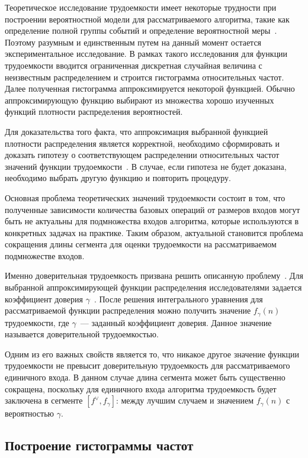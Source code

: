 \documentclass[a4paper, article, 14pt]{extarticle}
\begin{document}
Теоретическое исследование трудоемкости имеет некоторые трудности при построении вероятностной модели для рассматриваемого алгоритма, такие как определение полной группы событий и определение вероятностной меры~\cite{petrushyn_ulyanov_definitions}. Поэтому разумным и единственным путем на данный момент остается экспериментальное исследование. В рамках такого исследования для функции трудоемкости вводится ограниченная дискретная случайная величина с неизвестным распределением и строится гистограмма относительных частот. Далее полученная гистограмма аппроксимируется некоторой функцией. Обычно аппроксимирующую функцию выбирают из множества хорошо изученных функций плотности распределения вероятностей.

Для доказательства того факта, что аппроксимация выбранной функцией плотности распределения является корректной, необходимо сформировать и доказать гипотезу о соответствующем распределении относительных частот значений функции трудоемкости~\cite{petrushyn_ulyanov_planning}. В случае, если гипотеза не будет доказана, необходимо выбрать другую функцию и повторить процедуру.

Основная проблема теоретических значений трудоемкости состоит в том, что полученные зависимости количества базовых операций от размеров входов могут быть не актуальны для подмножества входов алгоритма, которые используются в конкретных задачах на практике. Таким образом, актуальной становится проблема сокращения длины сегмента для оценки трудоемкости на рассматриваемом подмножестве входов.

Именно доверительная трудоемкость призвана решить описанную проблему~\cite{petrushyn_ulyanov_analysis}. Для выбранной аппроксимирующей функции распределения исследователями задается коэффициент доверия $\gamma$~\cite{gmurman}. После решения интегрального уравнения для рассматриваемой функции распределения можно получить значение $f_\gamma(n)$ трудоемкости, где $\gamma$~--- заданный коэффициент доверия. Данное значение называется доверительной трудоемкостью.

Одним из его важных свойств является то, что никакое другое значение функции трудоемкости не превысит доверительную трудоемкость для рассматриваемого единичного входа. В данном случае длина сегмента может быть существенно сокращена, поскольку для единичного входа алгоритма трудоемкость будет заключена в сегменте $[f^\vee, f_\gamma]$: между лучшим случаем и значением $f_\gamma(n)$ с вероятностью $\gamma$.

\subsection{Построение гистограммы частот}\label{sec:frequency_histogram}
\end{document}

